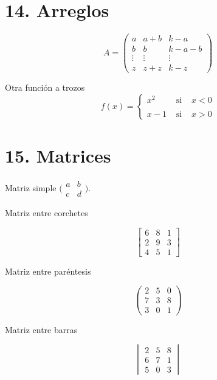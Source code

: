 \documentclass{article} %
\begin{document}
\section*{14. Arreglos}
\[
A = \left( \begin{array}{lcr}
a & a+b & k-a \\
b & b & k-a-b \\
\vdots & \vdots & \vdots \\
z & z + z & k-z
\end{array}
\right)
\]

Otra funci\'on a trozos
\[
f(x)= \left\{ \begin{array}{lcl}
x^2 & \mbox{ si } & x<0 \\
& & \\
x-1 & \mbox{ si } & x>0
\end{array}
\right.
\]

\section*{15. Matrices}

Matriz simple
$\bigl( \begin{smallmatrix}
    a & b \\ c & d
    \end{smallmatrix} \bigr)$.

Matriz entre corchetes

\begin{equation*}
    \begin{bmatrix}
    6 & 8 & 1\\
    2 & 9 & 3\\
    4 & 5 & 1
    \end{bmatrix}
\end{equation*}

Matriz entre paréntesis

\begin{equation*}
    \begin{pmatrix}
    2 & 5 & 0\\
    7 & 3 & 8\\
    3 & 0 & 1
    \end{pmatrix}
\end{equation*}

Matriz entre barras

\begin{equation*}
    \begin{vmatrix}
    2 & 5 & 8\\
    6 & 7 & 1\\
    5 & 0 & 3
    \end{vmatrix}
\end{equation*}
\end{document}

